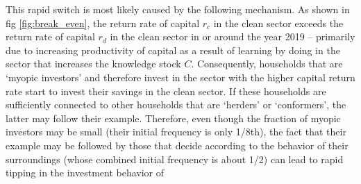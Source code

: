 This rapid switch is most likely caused by the following mechanism. As shown in fig \ref{fig:break_even}, the return rate of capital $r_c$ in the clean sector exceeds the return rate of capital $r_d$ in the clean sector in or around the year 2019 -- primarily due to increasing productivity of capital as a result of learning by doing in the sector that increases the knowledge stock $C$. Consequently, households that are `myopic investors' and therefore invest in the sector with the higher capital return rate start to invest their savings in the clean sector. If these households are sufficiently connected to other households that are `herders' or `conformers', the latter may follow their example. Therefore, even though the fraction of myopic investors may be small (their initial frequency is only 1/8th), the fact that their example may be followed by those that decide according to the behavior of their surroundings (whose combined initial frequency is about 1/2) can lead to rapid tipping in the investment behavior of 



